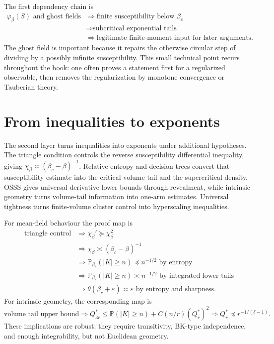 \documentclass[11pt,reqno]{book}
\numberwithin{equation}{chapter}
\theoremstyle{plain}
\theoremstyle{definition}
\theoremstyle{remark}
\renewcommand{\P}{\mathbb P}
\newcommand{\eps}{\varepsilon}
\newcommand{\1}{\mathbf 1}
\newcommand{\pre}{\preceq}
\newcommand{\suc}{\succeq}
\begin{document}
The first dependency chain is
\[
\begin{aligned}
\varphi_\beta(S)\text{ and ghost fields}
&\Longrightarrow \text{finite susceptibility below }\beta_c\\
&\Longrightarrow \text{subcritical exponential tails}\\
&\Longrightarrow \text{legitimate finite-moment input for later arguments}.
\end{aligned}
\]
The ghost field is important because it repairs the otherwise circular step of dividing by a possibly infinite susceptibility. This small technical point recurs throughout the book: one often proves a statement first for a regularized observable, then removes the regularization by monotone convergence or Tauberian theory.

\section{From inequalities to exponents}

The second layer turns inequalities into exponents under additional hypotheses. The triangle condition controls the reverse susceptibility differential inequality, giving $\chi_\beta\asymp(\beta_c-\beta)^{-1}$. Relative entropy and decision trees convert that susceptibility estimate into the critical volume tail and the supercritical density. OSSS gives universal derivative lower bounds through revealment, while intrinsic geometry turns volume-tail information into one-arm estimates. Universal tightness turns finite-volume cluster control into hyperscaling inequalities.

For mean-field behaviour the proof map is
\[
\begin{aligned}
\text{triangle control}
&\Longrightarrow \chi_\beta'\suc \chi_\beta^2\\
&\Longrightarrow \chi_\beta\asymp(\beta_c-\beta)^{-1}\\
&\Longrightarrow \P_{\beta_c}(|K|\geq n)\pre n^{-1/2}
    \text{ by entropy}\\
&\Longrightarrow \P_{\beta_c}(|K|\geq n)\asymp n^{-1/2}
    \text{ by integrated lower tails}\\
&\Longrightarrow \theta(\beta_c+\eps)\asymp\eps
    \text{ by entropy and sharpness}.
\end{aligned}
\]
For intrinsic geometry, the corresponding map is
\[
\text{volume tail upper bound}
\Longrightarrow
Q_{3r}^*\leq\P(|K|\geq n)+C(n/r)(Q_r^*)^2
\Longrightarrow
Q_r^*\pre r^{-1/(\delta-1)}.
\]
These implications are robust: they require transitivity, BK-type independence, and enough integrability, but not Euclidean geometry.
\end{document}
